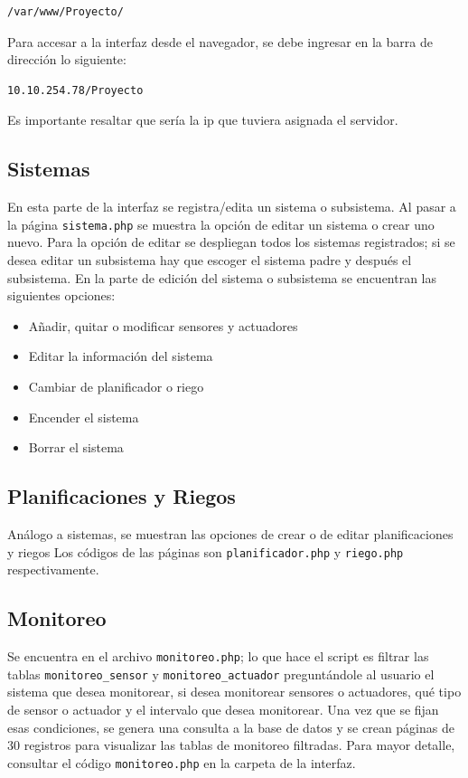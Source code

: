 \documentclass[a4paper,10pt,titlepage]{article}
\begin{document}
\begin{verbatim}
/var/www/Proyecto/
\end{verbatim}

Para accesar a la interfaz desde el navegador, se debe ingresar en la barra de direcci\'on lo siguiente:

\begin{verbatim}
10.10.254.78/Proyecto
\end{verbatim}

Es importante resaltar que ser\'ia la ip que tuviera asignada el servidor.

\subsection{Sistemas}
En esta parte de la interfaz se registra/edita un sistema o subsistema. Al pasar a la p\'agina \verb|sistema.php| se muestra la opci\'on de editar un sistema o 
crear uno nuevo. Para la opci\'on de editar se despliegan todos los sistemas registrados; si se desea editar un subsistema hay que escoger el sistema padre y despu\'es 
el subsistema. En la parte de edici\'on del sistema o subsistema se encuentran las siguientes opciones:

\begin{itemize}
\item A\~nadir, quitar o modificar sensores y actuadores
\item Editar la informaci\'on del sistema
\item Cambiar de planificador o riego
\item Encender el sistema
\item Borrar el sistema
\end{itemize}


\subsection{Planificaciones y Riegos}
An\'alogo a sistemas, se muestran las opciones de crear o de editar planificaciones y riegos Los c\'odigos de las p\'aginas son \verb|planificador.php| y \verb|riego.php| 
respectivamente.

\subsection{Monitoreo}
Se encuentra en el archivo \verb|monitoreo.php|; lo que hace el script es filtrar las tablas \verb|monitoreo_sensor| y \verb|monitoreo_actuador| pregunt\'andole al 
usuario el sistema que desea monitorear, si desea monitorear sensores o actuadores, qu\'e tipo de sensor o actuador y el intervalo que desea monitorear. Una vez 
que se fijan esas condiciones, se genera una consulta a la base de datos y se crean p\'aginas de 30 registros para visualizar las tablas de monitoreo filtradas. 
Para mayor detalle, consultar el c\'odigo \verb|monitoreo.php| en la carpeta de la interfaz.
\end{document}
